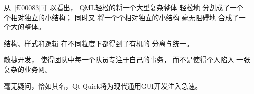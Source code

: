 从\filesourcenumbernameone\ \ref{f000083}可
以看出，
QML轻松的将一个大型复杂整体
轻松地
分割成了一个个相对独立的小结构；
同时又
将一个个相对独立的小结构
毫无阻碍地
合成了一个大的整体。

结构、样式和逻辑
在不同粒度下都得到了有机的
分离与统一。

敏捷开发，
使得团队中每一个队员专注于自己的事务，
而不是使得个人陷入
一张复杂的业务网。

毫无疑问，恰如其名，Qt Quick将为现代通用GUI开发注入急速。












